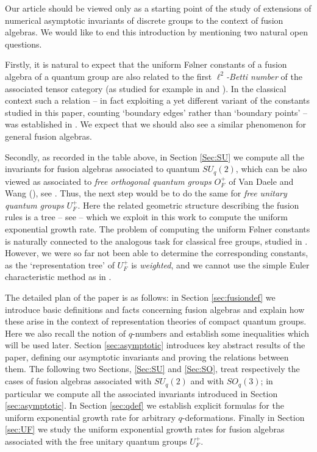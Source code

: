 \documentclass[11 pt, leqno]{amsart}
\theoremstyle{definition}
\numberwithin{equation}{section}
\begin{document}
Our article should be viewed only as a starting point of the study of extensions of numerical asymptotic invariants 
of discrete groups to the context of fusion algebras. We would like to end this introduction by mentioning two  natural open questions.

Firstly, it is natural to expect that the uniform F\o lner constants of a fusion algebra of a quantum group are also related to the first \emph{$\ell^2$-Betti number} of the associated tensor category (as studied for example in \cite{Kyed} and \cite{KRVV}). In the classical context such a relation -- in fact exploiting a yet different variant of the constants studied in this paper, counting `boundary edges' rather than `boundary points'  --  was established in \cite{LPV}. We expect that we should also see a similar phenomenon for general fusion algebras.

Secondly, as recorded in the table above, in Section \ref{Sec:SU} we compute all the invariants for fusion algebras associated to quantum $SU_q(2)$, which can be also viewed as associated to \emph{free orthogonal quantum groups} $O_F^+$ of Van Daele and Wang (\cite{VDW}), see \cite{BanicaOrth}. Thus, the next step would be to do the same for \emph{free unitary quantum groups} $U^+_F$. Here the related geometric structure describing the fusion rules is a tree -- see 
\cite{BanicaUnitary} -- which we exploit in this work to compute the uniform exponential growth rate. The problem of computing the uniform F\o lner constants is naturally connected to the analogous task for classical free groups, studied in \cite{Arzhantseva}. However, we were so far not been able to determine the corresponding constants, as the `representation tree' of $U_F^+$ is \emph{weighted}, and we cannot use the simple Euler characteristic method as in \cite[Proposition 5.2]{Arzhantseva}.


\smallskip

The detailed plan of the paper is as follows: in Section \ref{sec:fusiondef} we introduce basic definitions and facts concerning fusion algebras and explain how these arise in the context of representation theories of compact quantum groups. Here we also recall the notion of $q$-numbers and establish some inequalities which will be used later. Section \ref{sec:asymptotic} introduces key abstract results of the paper, defining our asymptotic invariants and proving the relations between them. The following two Sections, \ref{Sec:SU} and \ref{Sec:SO}, treat respectively the cases of fusion algebras associated with $SU_q(2)$ and with $SO_q(3)$; in particular we compute all the associated invariants introduced in Section \ref{sec:asymptotic}. In Section \ref{sec:qdef} we establish explicit formulas for the uniform exponential  growth rate for arbitrary $q$-deformations. Finally in Section \ref{sec:UF} we study  the uniform exponential growth rates for fusion algebras associated with the free unitary quantum groups $U_F^+$.
\end{document}
